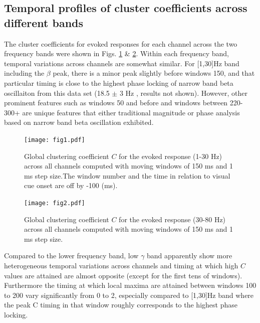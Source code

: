 \documentclass[letterpaper, 9pt, conference]{ieeeconf}
\begin{document}
\subsection{Temporal profiles of cluster coefficients across different bands}
The cluster coefficients for evoked responses for each channel across the two frequency bands were shown in Figs. \ref{fig:GC_low} \& \ref{fig:GC_high}. Within each frequency band, temporal variations across channels are somewhat similar. For [1,30]Hz band including the $\beta$ peak, there is a minor peak slightly before windows 150, and that particular timing is close to the highest phase locking of narrow band beta oscillaiton from this data set (18.5  $\pm$ 3 Hz , results not shown). However, other prominent features such as windows 50 and before and windows between 220-300+ are unique features that either traditional magnitude or phase analysis based on narrow band beta oscillation exhibited. 


\begin{figure}[ht!]
                             \texttt{[image: fig1.pdf]}
                             \caption{\label{fig:GC_low} Global clustering coefficient $C$ for the evoked response (1-30 Hz) across all channels computed with moving windows of 150 ms and 1 ms step size.The window number and the time in relation to visual cue onset are off by -100 (ms). }
\end{figure}

\begin{figure}[ht!]
                             \texttt{[image: fig2.pdf]}
                             \caption{\label{fig:GC_high} Global clustering coefficient $C$ for the evoked response (30-80 Hz) across all channels computed with moving windows of 150 ms and 1 ms step size.}
\end{figure}
 Compared to the lower frequency band, low $\gamma$ band apparently show more heterogeneous temporal variations across channels and timing at which high $C$ values are attained are almost opposite (except for the first tens of windows). Furthermore the timing at which local maxima are attained between windows 100 to 200 vary significantly from 0 to 2, especially compared to [1,30]Hz band where the peak C timing in that window roughly corresponds to the highest phase locking. 
 
\end{document}
